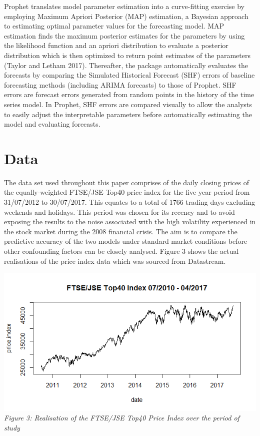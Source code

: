\documentclass[12pt,a4paper]{article}
\numberwithin{equation}{section}
\numberwithin{figure}{section}
\numberwithin{table}{section}
\begin{document}
Prophet translates model parameter estimation into a curve-fitting
exercise by employing Maximum Apriori Posterior (MAP) estimation, a
Bayesian approach to estimating optimal parameter values for the
forecasting model. MAP estimation finds the maximum posterior estimates
for the parameters by using the likelihood function and an apriori
distribution to evaluate a posterior distribution which is then
optimized to return point estimates of the parameters (Taylor and Letham
2017). Thereafter, the package automatically evaluates the forecasts by
comparing the Simulated Historical Forecast (SHF) errors of baseline
forecasting methods (including ARIMA forecasts) to those of Prophet. SHF
errors are forecast errors generated from random points in the history
of the time series model. In Prophet, SHF errors are compared visually
to allow the analysts to easily adjust the interpretable parameters
before automatically estimating the model and evaluating forecasts.

\section{Data}\label{data}

The data set used throughout this paper comprises of the daily closing
prices of the equally-weighted FTSE/JSE Top40 price index for the five
year period from 31/07/2012 to 30/07/2017. This equates to a total of
1766 trading days excluding weekends and holidays. This period was
chosen for its recency and to avoid exposing the results to the noise
associated with the high volatility experienced in the stock market
during the 2008 financial crisis. The aim is to compare the predictive
accuracy of the two models under standard market conditions before other
confounding factors can be closely analysed. Figure 3 shows the actual
realisations of the price index data which was sourced from Datastream.

\includegraphics[width=1.00000\textwidth]{plot of Price index.png}\\
\emph{Figure 3: Realisation of the FTSE/JSE Top40 Price Index over the
period of study}
\end{document}
